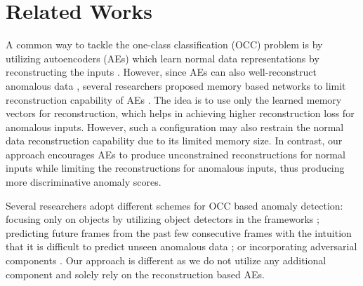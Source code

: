 \documentclass{bmvc2k}
\begin{document}
\section{Related Works}
\label{sec:relatedworks}
\vspace{-3mm}





 A common way to tackle the one-class classification (OCC) problem is by utilizing autoencoders (AEs) which learn normal data representations by reconstructing the inputs \cite{hasan2016learning,zhao2017spatio,luo2017revisit,luo2017remembering,gong2019memorizing,park2020learning}.
However, since AEs can also well-reconstruct anomalous data \cite{zong2018deep,munawar2017limiting,zaheer2020old,gong2019memorizing}, several researchers proposed memory based networks to limit reconstruction capability of AEs \cite{gong2019memorizing,park2020learning}. The idea is to use only the learned memory vectors for reconstruction, which helps in achieving higher reconstruction loss for anomalous inputs.
However, such a configuration may also restrain the normal data reconstruction capability due to its limited memory size.
In contrast, our approach encourages AEs to produce unconstrained reconstructions for normal inputs while limiting the reconstructions for anomalous inputs, thus producing more discriminative anomaly scores.



Several researchers adopt different schemes for OCC based anomaly detection: focusing only on objects by utilizing object detectors in the frameworks \cite{hinami2017joint,ionescu2019object,doshi2020any,doshi2020continual,sun2020scene,yu2020cloze,georgescu2021background}; predicting future frames from the past few consecutive frames with the intuition that it is difficult to predict unseen anomalous data \cite{liu2018future,park2020learning,lu2019future,lu2020few,dong2020dual};
or incorporating adversarial components \cite{ravanbakhsh2017abnormal,lee2019bman,liu2018future,vu2019robust,ji2020tam,lee2018stan}. 
Our approach is different as we do not utilize any additional component and solely rely on the reconstruction based AEs.
\end{document}
